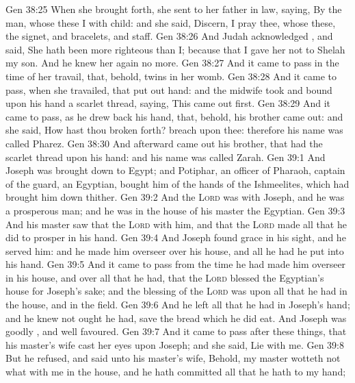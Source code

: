 \vs Gen 38:25 When she  brought forth, she sent to her father in law, saying, By the man, whose these  I with child: and she said, Discern, I pray thee, whose  these, the signet, and bracelets, and staff.
\vs Gen 38:26 And Judah acknowledged , and said, She hath been more righteous than I; because that I gave her not to Shelah my son. And he knew her again no more.
\vs Gen 38:27 And it came to pass in the time of her travail, that, behold, twins  in her womb.
\vs Gen 38:28 And it came to pass, when she travailed, that  put out  hand: and the midwife took and bound upon his hand a scarlet thread, saying, This came out first.
\vs Gen 38:29 And it came to pass, as he drew back his hand, that, behold, his brother came out: and she said, How hast thou broken forth?  breach  upon thee: therefore his name was called Pharez.
\vs Gen 38:30 And afterward came out his brother, that had the scarlet thread upon his hand: and his name was called Zarah.
\vs Gen 39:1 And Joseph was brought down to Egypt; and Potiphar, an officer of Pharaoh, captain of the guard, an Egyptian, bought him of the hands of the Ishmeelites, which had brought him down thither.
\vs Gen 39:2 And the \textsc{Lord} was with Joseph, and he was a prosperous man; and he was in the house of his master the Egyptian.
\vs Gen 39:3 And his master saw that the \textsc{Lord}  with him, and that the \textsc{Lord} made all that he did to prosper in his hand.
\vs Gen 39:4 And Joseph found grace in his sight, and he served him: and he made him overseer over his house, and all  he had he put into his hand.
\vs Gen 39:5 And it came to pass from the time  he had made him overseer in his house, and over all that he had, that the \textsc{Lord} blessed the Egyptian's house for Joseph's sake; and the blessing of the \textsc{Lord} was upon all that he had in the house, and in the field.
\vs Gen 39:6 And he left all that he had in Joseph's hand; and he knew not ought he had, save the bread which he did eat. And Joseph was  goodly , and well favoured.
\vs Gen 39:7 And it came to pass after these things, that his master's wife cast her eyes upon Joseph; and she said, Lie with me.
\vs Gen 39:8 But he refused, and said unto his master's wife, Behold, my master wotteth not what  with me in the house, and he hath committed all that he hath to my hand;
